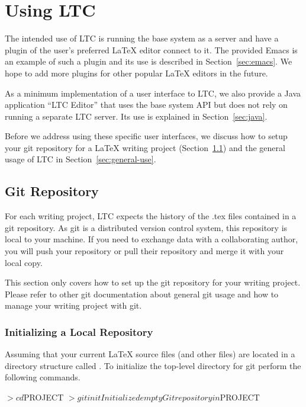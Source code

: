 \chapter{Using LTC}

The intended use of LTC is running the base system as a server and have a plugin of the user's preferred LaTeX editor connect to it.  The provided Emacs  is an example of such a plugin and its use is described in Section~\ref{sec:emacs}.  We hope to add more plugins for other popular LaTeX editors in the future.

As a minimum implementation of a user interface to LTC, we also provide a Java application ``LTC Editor'' that uses the base system API but does not rely on running a separate LTC server.  Its use is explained in Section~\ref{sec:java}.

Before we address using these specific user interfaces, we discuss how to setup your git repository for a LaTeX writing project (Section~\ref{sec:git-use}) and the general usage of LTC in Section~\ref{sec:general-use}.

\section{Git Repository} \label{sec:git-use}

For each writing project, LTC expects the history of the .tex files contained in a git repository.  As git is a distributed version control system, this repository is local to your machine.  If you need to exchange data with a collaborating author, you will push your repository or pull their repository and merge it with your local copy.

This section only covers how to set up the git repository for your writing project.  Please refer to other git documentation about general git usage and how to manage your writing project with git.

\subsection{Initializing a Local Repository}

Assuming that your current LaTeX source files (and other files) are located in a directory structure called .  To initialize the top-level directory for git perform the following commands.
\begin{CodeVerbatim}
$> cd $PROJECT
$> git init 
Initialized empty Git repository in $PROJECT
\end{CodeVerbatim}

